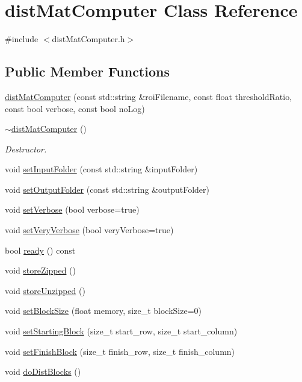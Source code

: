 \hypertarget{classdistMatComputer}{\section{dist\-Mat\-Computer \-Class \-Reference}
\label{classdistMatComputer}
}


{\ttfamily \#include $<$dist\-Mat\-Computer.\-h$>$}

\subsection*{\-Public \-Member \-Functions}
\begin{DoxyCompactItemize}
\item 
\hyperlink{classdistMatComputer_af47f2049b738d55b15292d1cd7759266}{dist\-Mat\-Computer} (const std\-::string \&roi\-Filename, const float threshold\-Ratio, const bool verbose, const bool no\-Log)
\item 
\hypertarget{classdistMatComputer_a4b82a46e53e59f31cfa99937853e4dd5}{\hyperlink{classdistMatComputer_a4b82a46e53e59f31cfa99937853e4dd5}{$\sim$dist\-Mat\-Computer} ()}\label{classdistMatComputer_a4b82a46e53e59f31cfa99937853e4dd5}

\begin{DoxyCompactList}\small\item\em \-Destructor. \end{DoxyCompactList}\item 
void \hyperlink{classdistMatComputer_a3eda189c29b6a4b33b7fb79fab285da7}{set\-Input\-Folder} (const std\-::string \&input\-Folder)
\item 
void \hyperlink{classdistMatComputer_a7b057ae664355192ff54f5f1b0c88674}{set\-Output\-Folder} (const std\-::string \&output\-Folder)
\item 
void \hyperlink{classdistMatComputer_ad37c8350132ca868e82650deb26c83c4}{set\-Verbose} (bool verbose=true)
\item 
void \hyperlink{classdistMatComputer_a76d5666d4cc06e25294581909d563274}{set\-Very\-Verbose} (bool very\-Verbose=true)
\item 
bool \hyperlink{classdistMatComputer_ae8cb9613de8d550b5afb19954a219c65}{ready} () const 
\item 
void \hyperlink{classdistMatComputer_a2b69c255a55d06f9df8e77b1e6850224}{store\-Zipped} ()
\item 
void \hyperlink{classdistMatComputer_a908bfd7d361ebc0e07a353ecdce679fe}{store\-Unzipped} ()
\item 
void \hyperlink{classdistMatComputer_ac59ef6082cafa97fcc329143ca76a713}{set\-Block\-Size} (float memory, size\-\_\-t block\-Size=0)
\item 
void \hyperlink{classdistMatComputer_ae64101f05afd177f478bfb41b7bc4866}{set\-Starting\-Block} (size\-\_\-t start\-\_\-row, size\-\_\-t start\-\_\-column)
\item 
void \hyperlink{classdistMatComputer_aa63d6957fa826dc56f6bc7be3db2ad22}{set\-Finish\-Block} (size\-\_\-t finish\-\_\-row, size\-\_\-t finish\-\_\-column)
\item 
void \hyperlink{classdistMatComputer_a33aff7e2ad324c0a59b3302a929a6e5f}{do\-Dist\-Blocks} ()
\end{DoxyCompactItemize}


